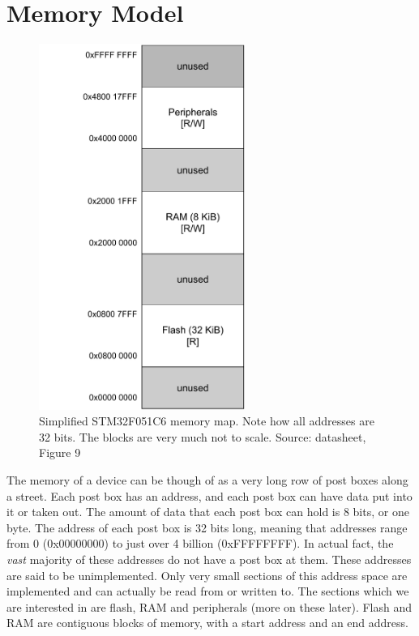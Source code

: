 \chapter{Memory Model}
\begin{figure}
  \centering
  \includegraphics[width=0.6\textwidth]{./week1/memory_model_v0.pdf}
  \caption{Simplified STM32F051C6 memory map. Note how all addresses are 32 bits. The blocks are very much not to scale. Source: datasheet, Figure 9}
\end{figure}
The memory of a device can be though of as a very long row of post boxes along a street. Each post box has an address, and each post box can have data put into it or taken out. The amount of data that each post box can hold is 8 bits, or one byte. 
The address of each post box is 32 bits long, meaning that addresses range from 0 (0x00000000) to just over 4 billion (0xFFFFFFFF). In actual fact, the \emph{vast} majority of these addresses do not have a post box at them. These addresses are said to be unimplemented. 
Only very small sections of this address space are implemented and can actually be read from or written to.
The sections which we are interested in are flash, RAM and peripherals (more on these later). Flash and RAM are contiguous blocks of memory, with a start address and an end address. \\

